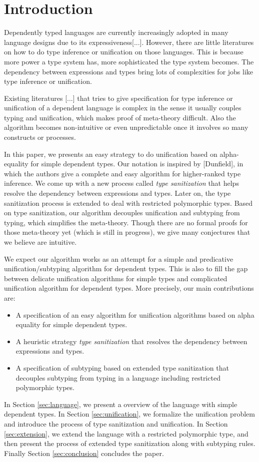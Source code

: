 \section{Introduction}

Dependently typed languages are currently increasingly adopted in many language
designs due to its expressiveness[...]. However, there are little literatures on
how to do type inference or unification on those languages. This is because
more power a type system has, more sophisticated the type system
becomes. The dependency between expressions and types bring lots of complexities
for jobs like type inference or unification.

Existing literatures [...] that tries to give specification for type inference
or unification of
a dependent language is complex in the sense it usually couples typing
and unification, which makes proof of meta-theory difficult.
Also the algorithm becomes non-intuitive or even unpredictable once it involves
so many constructs or processes.

In this paper, we presents an easy strategy to do unification based on
alpha-equality for simple dependent
types. Our notation is inspired by [Dunfield], in which the authors give a complete
and easy algorithm for higher-ranked type inference. We come up with a new
process called \textit{type sanitization} that helps resolve the dependency
between expressions and types. Later on, the type sanitization process is
extended to deal with restricted polymorphic types.
Based on type sanitization, our algorithm
decouples unification and subtyping from typing, which simplifies the
meta-theory. Though there are no formal proofs for those meta-theory yet (which
is still in progress),
we give many conjectures that we believe are intuitive.

We expect our algorithm works as an attempt
for a simple and predicative unification/subtyping algorithm for dependent
types. This is also to
fill the gap between
delicate unification algorithms for simple types
and
complicated unification algorithm for dependent types.
More precisely, our main contributions are:

\begin{itemize}
  \item A specification of an easy algorithm for unification algorithms based on
    alpha equality for
    simple dependent types.
  \item A heuristic strategy \textit{type sanitization} that resolves the
    dependency between expressions and types.
  \item A specification of subtyping based on extended type sanitization that
    decouples
      subtyping from typing in a language including restricted polymorphic types.
\end{itemize}

In Section \ref{sec:language}, we present a overview of the language with simple
dependent types. In Section \ref{sec:unification}, we formalize the unification
problem and introduce the process of type sanitization and unification. In
Section \ref{sec:extension}, we extend the language with a restricted
polymorphic type, and then present the process of extended type sanitization
along with subtyping rules. Finally Section \ref{sec:conclusion} concludes the
paper.